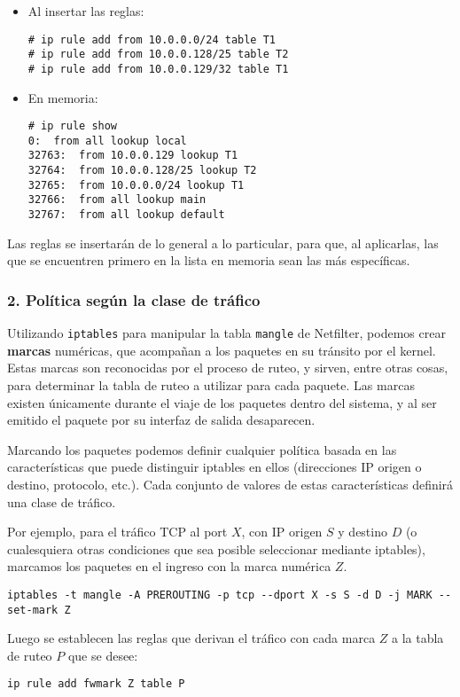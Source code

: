 \begin{itemize}
	\item Al insertar las reglas: 
\begin{lstlisting}
# ip rule add from 10.0.0.0/24 table T1
# ip rule add from 10.0.0.128/25 table T2
# ip rule add from 10.0.0.129/32 table T1
\end{lstlisting}
	\item En memoria:
	\begin{lstlisting}
# ip rule show
0:	from all lookup local 
32763:	from 10.0.0.129 lookup T1
32764:	from 10.0.0.128/25 lookup T2 
32765:	from 10.0.0.0/24 lookup T1 
32766:	from all lookup main 
32767:	from all lookup default 
\end{lstlisting}
\end{itemize}

Las reglas se insertarán de lo general a lo particular, para que, al aplicarlas, las que se encuentren primero en la lista en memoria sean las más específicas. 
 
\subsubsection{2. Política según la clase de tráfico}

Utilizando \texttt{iptables} para manipular la tabla \texttt{mangle} de Netfilter, podemos crear \textbf{marcas} numéricas, que acompañan a los paquetes en su tránsito por el kernel. Estas marcas son reconocidas por el proceso de ruteo, y sirven, entre otras cosas, para determinar la tabla de ruteo a utilizar para cada paquete. Las marcas existen únicamente durante el viaje de los paquetes dentro del sistema, y al ser emitido el paquete por su interfaz de salida desaparecen. 

Marcando los paquetes podemos definir cualquier política basada en las características que puede distinguir iptables en ellos (direcciones IP origen o destino, protocolo, etc.). Cada conjunto de valores de estas características definirá una clase de tráfico.

Por ejemplo, para el tráfico TCP al port $X$, con IP origen $S$ y destino $D$ (o cualesquiera otras condiciones que sea posible seleccionar mediante iptables), marcamos los paquetes en el ingreso con la marca numérica $Z$.
\begin{lstlisting}
iptables -t mangle -A PREROUTING -p tcp --dport X -s S -d D -j MARK --set-mark Z
\end{lstlisting}

Luego se establecen las reglas que derivan el tráfico con cada marca $Z$ a la tabla de ruteo $P$ que se desee:
\begin{lstlisting}
ip rule add fwmark Z table P
\end{lstlisting}

